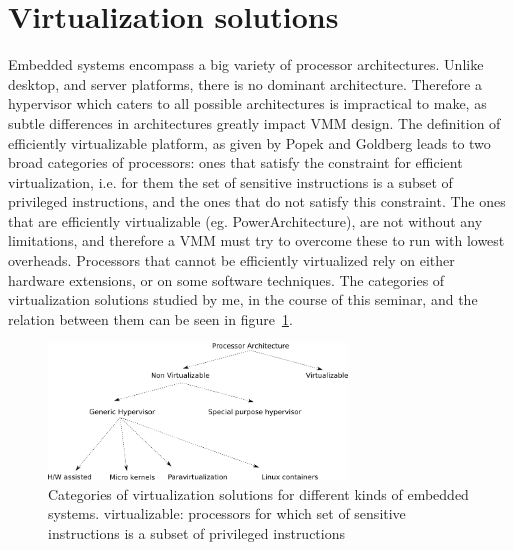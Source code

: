 \documentclass[seminar,twoside]{iitbreport}
\begin{document}
\section{Virtualization solutions} \label{virtsol}
Embedded systems encompass a big variety of processor architectures. Unlike desktop, and server platforms, there is no dominant architecture. 
Therefore a hypervisor which caters to all possible architectures is impractical to make, as subtle differences in architectures greatly impact VMM design. The definition of efficiently virtualizable platform, as given by Popek and Goldberg\cite{Popek:1974:FRV:361011.361073} leads to
 two broad categories of processors: ones that satisfy the constraint for efficient virtualization, i.e. for them the set of sensitive instructions is a subset of privileged instructions, 
 and the ones that do not satisfy this constraint. The ones that are efficiently virtualizable (eg. PowerArchitecture), are not without any limitations, and therefore a VMM must try to overcome these
 to run with lowest overheads. Processors that cannot be efficiently virtualized rely on either hardware extensions, or on some software techniques. The categories of
 virtualization solutions studied by me, in the course of this seminar, and the relation between them can be seen in figure~\ref{fig:papers}.
\\
 \begin{figure}[ht]
 \centering
 \includegraphics[width=300px]{papers}
 \caption[Categories of virtualization solutions for different kinds of embedded systems]{Categories of virtualization solutions for different kinds of embedded systems. \footnotesize{ virtualizable: processors for which set of sensitive instructions is a subset of
 privileged instructions} \label{fig:papers}}
 \end{figure}
    
\end{document}

